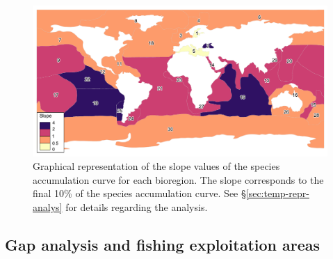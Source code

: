 \documentclass[12pt,authoryear]{elsarticle}
\providecommand{\DIFaddbeginFL}{} %
\providecommand{\DIFaddendFL}{} %
\providecommand{\DIFdelbeginFL}{} %
\providecommand{\DIFdelendFL}{} %
\begin{document}
\begin{figure}
  \centering
  \DIFdelbeginFL %
\DIFdelendFL \DIFaddbeginFL \includegraphics[width=\textwidth]{Fig_4}
    \DIFaddendFL \caption{Graphical representation of the slope values of the species accumulation curve  for each bioregion. The slope corresponds to the final 10\%  of the species accumulation curve. See \S \ref{sec:temp-repr-analys} for details regarding the analysis.}
     \label{fig:Slopefinal}
\end{figure}

\subsection{Gap analysis and fishing exploitation areas}
\label{sec:GAP}
\end{document}
